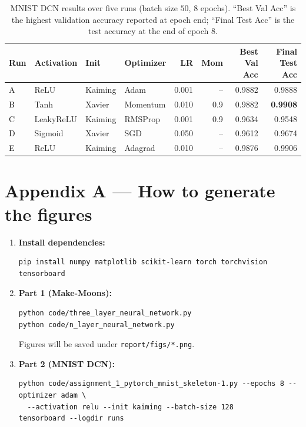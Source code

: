 \documentclass[11pt]{article}
\begin{document}
\begin{table}[H]
\centering
\small
\begin{tabular}{@{}l l l l r r r r@{}}
\toprule
\textbf{Run} & \textbf{Activation} & \textbf{Init} & \textbf{Optimizer} & \textbf{LR} & \textbf{Mom} & \textbf{Best Val Acc} & \textbf{Final Test Acc} \\
\midrule
A & ReLU        & Kaiming & Adam     & 0.001 & --   & 0.9882 & 0.9888 \\
B & Tanh        & Xavier  & Momentum & 0.010 & 0.9  & 0.9882 & \textbf{0.9908} \\
C & LeakyReLU   & Kaiming & RMSProp  & 0.001 & 0.9  & 0.9634 & 0.9548 \\
D & Sigmoid     & Xavier  & SGD      & 0.050 & --   & 0.9612 & 0.9674 \\
E & ReLU        & Kaiming & Adagrad  & 0.010 & --   & 0.9876 & 0.9906 \\
\bottomrule
\end{tabular}
\caption{MNIST DCN results over five runs (batch size $50$, 8 epochs). “Best Val Acc” is the highest validation accuracy reported at epoch end; “Final Test Acc” is the test accuracy at the end of epoch 8.}
\end{table}


\newpage

\section*{Appendix A --- How to generate the figures}
\begin{enumerate}[leftmargin=1.2em]
  \item \textbf{Install dependencies:}
\begin{verbatim}
pip install numpy matplotlib scikit-learn torch torchvision tensorboard
\end{verbatim}
  \item \textbf{Part 1 (Make-Moons):}
\begin{verbatim}
python code/three_layer_neural_network.py
python code/n_layer_neural_network.py
\end{verbatim}
  Figures will be saved under \texttt{report/figs/*.png}.
  \item \textbf{Part 2 (MNIST DCN):}
\begin{verbatim}
python code/assignment_1_pytorch_mnist_skeleton-1.py --epochs 8 --optimizer adam \
  --activation relu --init kaiming --batch-size 128
tensorboard --logdir runs
\end{verbatim}
\end{enumerate}
\end{document}
